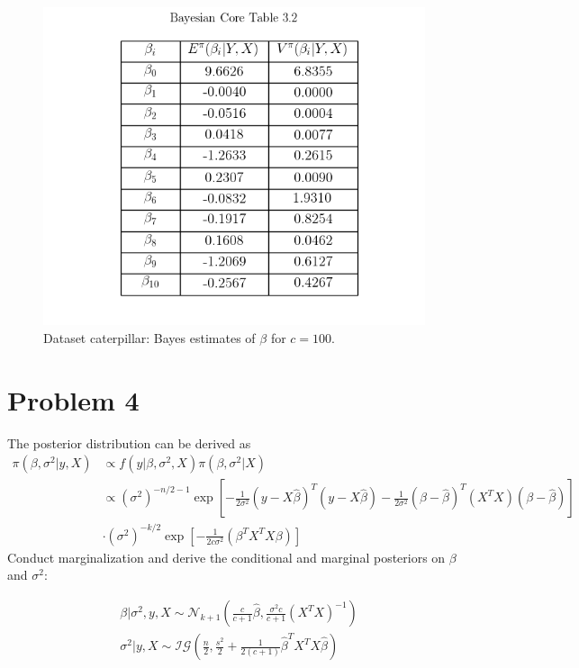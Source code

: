 \documentclass{article}
\begin{document}
\begin{figure}[h!]
\centering
\includegraphics[scale=0.6]{Table3_2.png}
\caption{Dataset caterpillar: Bayes estimates of $\beta$ for $c=100$.}
\end{figure}

\newpage
\section{Problem 4}
The posterior distribution can be  derived as 
\begin{equation}
\begin{aligned}
    \pi(\beta,\sigma^2|y,X) & \propto f(y|\beta,\sigma^2,X)\pi(\beta,\sigma^2|X) \\
    &\propto (\sigma^{2})^{-n/2-1} \exp [-\frac{1}{2\sigma^2}(y-X\hat{\beta})^{T}(y-X\hat{\beta})-\frac{1}{2\sigma^2}(\beta-\hat{\beta})^{T}(X^{T}X)(\beta-\hat{\beta})]\\
    &\cdot (\sigma^2)^{-k/2} \exp[-\frac{1}{2c\sigma^2}(\beta^T X^T X\beta)]
\end{aligned}
\end{equation}
Conduct marginalization and derive the conditional and marginal posteriors on $\beta$ and $\sigma^{2}$:

\begin{equation}
\begin{aligned}
    & \beta | \sigma^{2},y, X \sim \mathcal{N}_{k+1}(\frac{c}{c+1}\hat{\beta}, \frac{\sigma^2 c}{c+1}(X^{T} X)^{-1}) \\
     & \sigma^2 | y, X \sim \mathcal{IG}(\frac{n}{2}, \frac{s^2}{2}+\frac{1}{2(c+1)}\hat{\beta}^T X^T X \hat{\beta}) \\
\end{aligned}
\end{equation}
\end{document}
